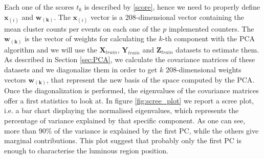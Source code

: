 Each one of the scores $t_k$ is described by \eqref{score}, hence we need to properly define $\mathbf{x}_{(i)}$ and $\mathbf{w_{(k)}}$. The $\mathbf{x}_{(i)}$ vector is a 208-dimensional vector containing the mean cluster counts per events on each one of the $p$ implemented counters. The  $\mathbf{w_{(k)}}$ is the vector of weights for calculating the $k$-th component with the PCA algorithm and we will use the $\mathbf{X}_{train}$, $\mathbf{Y}_{train}$ and $\mathbf{Z}_{train}$ datasets to estimate them. As described in Section \ref{sec:PCA}, we calculate the covariance matrices of these datasets and we diagonalize them in order to get $k$ 208-dimensional weights vectors $\mathbf{w_{(k)}}$, that represent the new basis of the space computed by the PCA. 
Once the diagonalization is performed, the eigenvalues of the covariance matrices offer a first statistics to look at. In figure \ref{fig:scree_plot} we report a scree plot, i.e. a bar chart displaying the normalised eigenvalues, which represents the percentage of variance explained by that specific component. As one can see, more than 90\% of the variance is explained by the first PC, while the others give marginal contributions. This plot suggest that probably only the first PC is enough to characterise the luminous region position.
